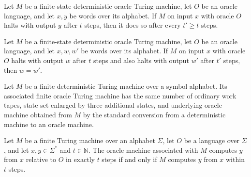 \begin{theorem}
\label{Turing.FinOracleTM.ComputesInTime.mono}
\leanok
{}
Let $M$ be a finite-state deterministic oracle Turing machine, let $O$ be an oracle
language, and let $x,y$ be words over its alphabet. If $M$ on input $x$ with oracle $O$
halts with output $y$ after $t$ steps, then it does so after every $t'\ge t$ steps.
\end{theorem}

\begin{theorem}
\label{Turing.FinOracleTM.ComputesInTime.output_unique}
\leanok
{}
Let $M$ be a finite-state deterministic oracle Turing machine, let $O$ be an oracle
language, and let $x,w,w'$ be words over its alphabet. If $M$ on input $x$ with oracle
$O$ halts with output $w$ after $t$ steps and also halts with output $w'$ after $t'$
steps, then $w=w'$.
\end{theorem}

\begin{definition}
\label{Turing.FinTM.toFinOracleTM}
\leanok
{}
Let $M$ be a finite deterministic Turing machine over a symbol alphabet. Its associated
finite oracle Turing machine has the same number of ordinary work tapes, state set
enlarged by three additional states, and underlying oracle machine obtained from $M$ by
the standard conversion from a deterministic machine to an oracle machine.
\end{definition}

\begin{theorem}
\label{Turing.FinTM.toFinOracleTM_computesInTime}
\leanok
{}
Let $M$ be a finite Turing machine over an alphabet $\Sigma$, let $O$ be a language over
$\Sigma$, and let $x,y\in\Sigma^*$ and $t\in\mathbb{N}$. The oracle machine associated
with $M$ computes $y$ from $x$ relative to $O$ in exactly $t$ steps if and only if $M$
computes $y$ from $x$ within $t$ steps.
\end{theorem}
